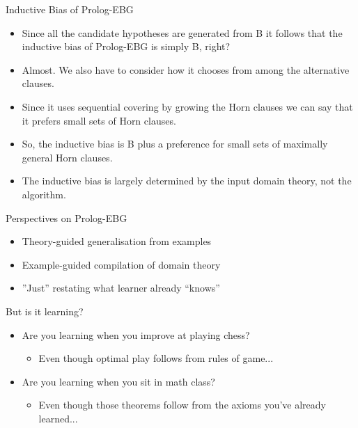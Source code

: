\documentclass[%
pdf,
colorBG,
slideColor,
tcrico,
]{prosper}
\begin{document}
\begin{slide}{Inductive Bias of Prolog-EBG}
	\begin{itemize}
	\item Since all the candidate hypotheses are generated from B it follows that the inductive bias of Prolog-EBG is simply B, right?
    	\item Almost. We also have to consider how it chooses from among the alternative clauses.
    	\item Since it uses sequential covering by growing the Horn clauses we can say that it prefers small sets of Horn clauses.
    	\item So, the inductive bias is B plus a preference for small sets of maximally general Horn clauses.
    \item The inductive bias is largely determined by the input domain theory, not the algorithm.
\end{itemize}
\end{slide}


\begin{slide}{Perspectives on Prolog-EBG }
	\begin{itemize}
	\item Theory-guided generalisation from examples
	\item Example-guided compilation of domain theory
	\item ''Just'' restating what learner already ``knows''
	\end{itemize}
	
	But is it learning?
	\begin{itemize}
	\item Are you learning when you improve at playing chess?
		\begin{itemize} 
		\item Even though optimal play follows from rules of game... 
		\end{itemize}
	\item Are you learning when you sit in math class?
		\begin{itemize} \item Even though those theorems follow from the axioms you've already learned... \end{itemize}
	\end{itemize}
\end{slide}
\end{document}
